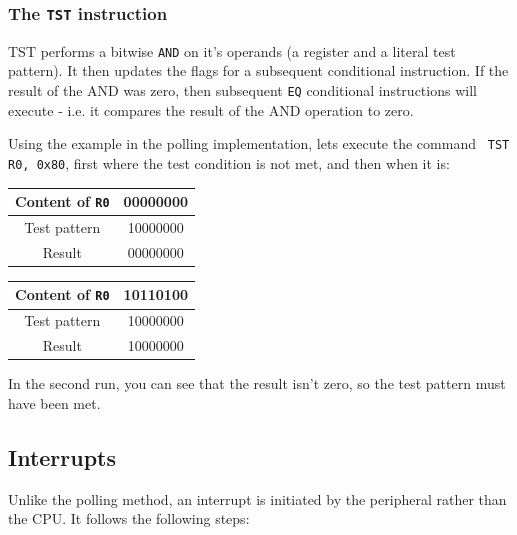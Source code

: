 \subsubsection{The {\tt TST} instruction}

TST performs a bitwise {\tt AND} on it's operands (a register and a literal test
pattern). It then updates the flags for a subsequent conditional instruction. If
the result of the AND was zero, then subsequent {\tt EQ} conditional
instructions will execute - i.e. it compares the result of the AND operation to
zero.

Using the example in the polling implementation, lets execute the command {\tt
TST R0, 0x80}, first where the test condition is not met, and then when it is:

\begin{center}
	\begin{tabular}{c|c}
		Content of {\tt R0} & 00000000\\ \hline
		Test pattern & 10000000\\ \hline
		Result & 00000000\\ \hline
	\end{tabular}

	\begin{tabular}{c|c}
		Content of {\tt R0} & 10110100\\ \hline
		Test pattern & 10000000\\ \hline
		Result & 10000000\\ \hline
	\end{tabular}
\end{center}

In the second run, you can see that the result isn't zero, so the test pattern
must have been met.

\subsection{Interrupts}

Unlike the polling method, an interrupt is initiated by the peripheral rather
than the CPU. It follows the following steps:

